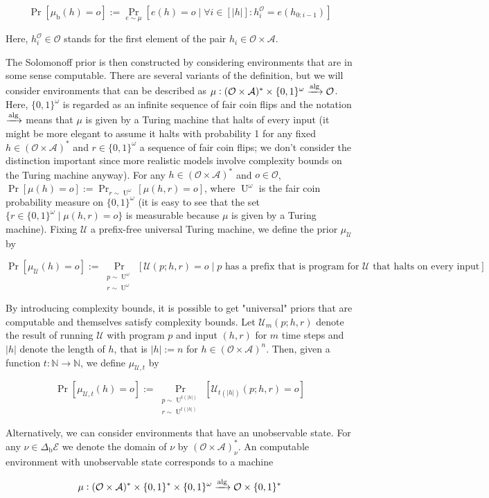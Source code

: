 \documentclass[a4paper]{article}
\newcommand{\Bool}{\{0,1\}}
\newcommand{\Words}{{\Bool^*}}
\newcommand{\Sagas}{{\Bool^\omega}}
\DeclareMathOperator{\Prb}{Pr}
\newcommand{\PP}[2]{\operatorname{Pr}_{\substack{#1 \\ #2}}}
\DeclareMathOperator{\Un}{U}
\newcommand{\Nats}{\mathbb{N}}
\newcommand{\Abs}[1]{\lvert #1 \rvert}
\newcommand{\Alg}{\xrightarrow{\textnormal{alg}}}
\newcommand{\UTM}{\mathcal{U}}
\newcommand{\Act}{\mathcal{A}}
\newcommand{\Per}{\mathcal{O}}
\newcommand{\His}{(\Per \times \Act)^*}
\newcommand{\Env}{\mathcal{E}}
\newcommand{\Beh}{\Delta_{\operatorname{b}}}
\newcommand{\EnvB}{\Beh\Env}
\begin{document}
$$\Prb[\mu_{\operatorname{b}}(h)=o]:=\Prb_{e \sim \mu}[e(h) = o \mid \forall i \in [\Abs{h}]: h^\Per_{i} = e(h_{0:i-1})]$$

Here, ${h^\Per_{i} \in \Per}$ stands for the first element of the pair ${h_i \in \Per \times \Act}$.

The Solomonoff prior is then constructed by considering environments that are in some sense computable. There are several variants of the definition, but we will consider environments that can be described as ${\mu: \His \times \Sagas \Alg \Per}$. Here, ${\Sagas}$ is regarded as an infinite sequence of fair coin flips and the notation ${\Alg}$ means that ${\mu}$ is given by a Turing machine that halts of every input (it might be more elegant to assume it halts with probability 1 for any fixed ${h \in \His}$ and ${r \in \Sagas}$ a sequence of fair coin flips; we don't consider the distinction important since more realistic models involve complexity bounds on the Turing machine anyway). For any ${h \in \His}$ and ${o \in \Per}$, ${\Prb[\mu(h)=o]:=\Prb_{r \sim \Un^\omega}[\mu(h,r)=o]}$, where ${\Un^\omega}$ is the fair coin probability measure on ${\Sagas}$ (it is easy to see that the set ${\{r \in \Sagas \mid \mu(h,r)=o\}}$ is measurable because ${\mu}$ is given by a Turing machine). Fixing ${\UTM}$ a prefix-free universal Turing machine, we define the prior ${\mu_\UTM}$ by 

$${\Prb[\mu_{\UTM}(h)=o]:=\PP{p \sim \Un^\omega}{r \sim \Un^\omega}[\UTM(p;h,r)=o \mid p \text{ has a prefix that is program for } \UTM \text{ that halts on every input}]}$$

By introducing complexity bounds, it is possible to get "universal" priors that are computable and themselves satisfy complexity bounds. Let ${\UTM_m(p;h,r)}$ denote the result of running ${\UTM}$ with program ${p}$ and input ${(h,r)}$ for ${m}$ time steps and ${\Abs{h}}$ denote the length of ${h}$, that is ${\Abs{h}:=n}$ for ${h \in (\Per \times \Act)^n}$. Then, given a function ${t: \Nats \rightarrow \Nats}$, we define ${\mu_{\UTM,t}}$ by

$${\Prb[\mu_{\UTM,t}(h)=o]:=\PP{p \sim \Un^{t(\Abs{h})}}{r \sim \Un^{t(\Abs{h})}}[\UTM_{t(\Abs{h})}(p;h,r)=o]}$$

Alternatively, we can consider environments that have an unobservable state. For any ${\nu \in \EnvB}$ we denote the domain of ${\nu}$ by ${\His_\nu}$. An computable environment with unobservable state corresponds to a machine

$${\mu: \His \times \Words \times \Sagas \Alg \Per \times \Words}$$ 
\end{document}

